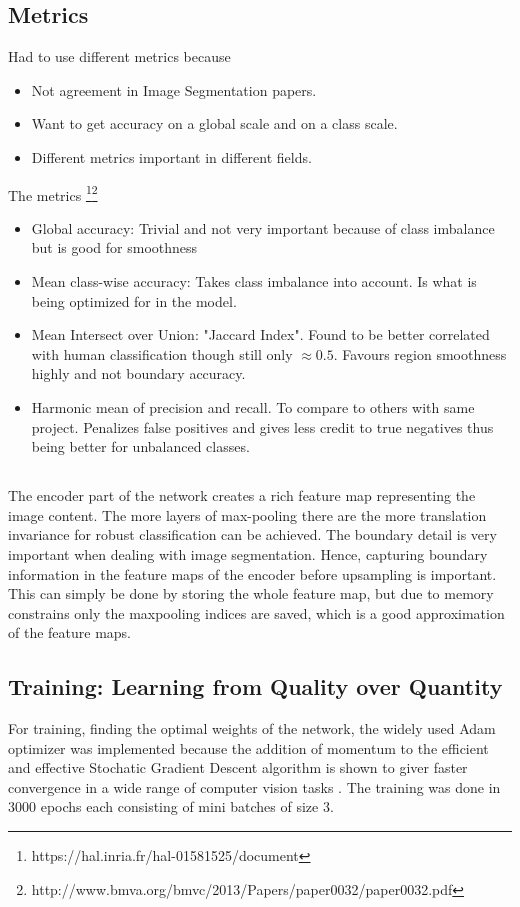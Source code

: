 \documentclass{article}
\begin{document}
\subsection{Metrics}
Had to use different metrics because
\begin{itemize}
	\item Not agreement in Image Segmentation papers.
	\item Want to get accuracy on a global scale and on a class scale.
	\item Different metrics important in different fields.
\end{itemize}
The metrics \footnote{https://hal.inria.fr/hal-01581525/document}\footnote{
	http://www.bmva.org/bmvc/2013/Papers/paper0032/paper0032.pdf} 
\begin{itemize}
	\item Global accuracy: Trivial and  not very important because of class imbalance but is good for smoothness
	\item Mean class-wise accuracy: Takes class imbalance into account. Is what is being optimized for in the model.
	\item Mean Intersect over Union: "Jaccard Index".  Found to be better correlated with human classification though still only \(\approx 0.5\). Favours region smoothness highly and not boundary accuracy.
	\item Harmonic mean of precision and recall. To compare to others with same project. Penalizes false positives and gives less credit to true negatives thus being better for unbalanced classes.
\end{itemize}

\subsection{}
The encoder part of the network creates a rich feature map representing the image content. The more 
layers of max-pooling there are the more translation invariance for robust 
classification can be achieved. The boundary detail is very important when 
dealing with image segmentation. Hence, capturing boundary information in 
the feature maps of the encoder before upsampling is important. This can 
simply be done by storing the whole feature map, but due to memory 
constrains only the maxpooling indices are saved, which is a good 
approximation of the feature maps. 
\subsection{Training: Learning from Quality over Quantity}
For training, finding the optimal weights of the network, the widely used Adam optimizer  was implemented because the addition of momentum to the efficient and effective Stochatic Gradient Descent algorithm is shown to giver faster convergence in a wide range of computer vision tasks \cite{Adam}. The training was done in 3000 epochs each consisting of mini batches of size 3.
\end{document}
